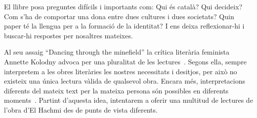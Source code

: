 El llibre posa preguntes difícils i importants com:
Qui és català? Qui decideix?
Com s'ha de comportar una dona entre dues cultures i dues societats?
Quin paper té la llengua per a la formació de la identitat?
I ens deixa reflexionar-hi i buscar-hi respostes per nosaltres mateixes.

Al seu assaig ``Dancing through the minefield'' la crítica literària feminista Annette Kolodny advoca per una pluralitat de les lectures~\autocite{Kolodny1980}.
Segons ella, sempre interpretem a les obres literàries les nostres necessitats i desitjos, per això no existeix una única lectura vàlida de qualsevol obra.
Encara més, interpretacions diferents del mateix text per la mateixa persona són possibles en diferents moments~\autocite{Kolodny1980}.
Partint d'aquesta idea, intentarem a oferir una multitud de lectures de l'obra d'El Hachmi des de punts de vista diferents.

\begin{comment}
\subsection{Estructura de la monografia}
Aquest treball està organitzat de la següent manera.
Primer, presentarem el marc teòric dins el qual volem analitzar el roman ``L'últim patriarca''.
A continuació, discutirem multiples facetes de l'obra i proposarem lectures diferents.
En conclusió, ...
\end{comment}

\begin{comment}
Fragestellung:
??
verschiedene readings anbieten:
* interseccionalitat
* translation/language
* laurie penny

--> adrienne rich/anette kolodny in die intro nehmen
Annette Kolodny: "In my view, our purpose is not and should not be the formulation of
any single reading method or potentially procrustean set of critical procedures[...] Instead, as I see it, our
task is to initiate nothing less than a playful pluralism, responsice to the possibilities of multiple critical
schools and methods, but captive of none.."

Leitfragen/themen:
* Qui és català? Qui decideix?
* La dona entre dues cultures i dues societats: expectacions, sentiments,... | interseccionalitat
* La dona en una societat machista                                           |
* coming-of-age
* el paper de la llengua

------

Motto candidates:

“The greatest masterpiece in literature is only a dictionary out of order.”
― Jean Cocteau
VA: Jean Cocteau once quipped that even the greatest masterpieces of literature are nothing but a
dictionary out of order.
(Stavans: Dictionaries Interview)

"IS: Every translation is a misrepresentation."
(Stavans: Dictionaries Interview)
\end{comment}
